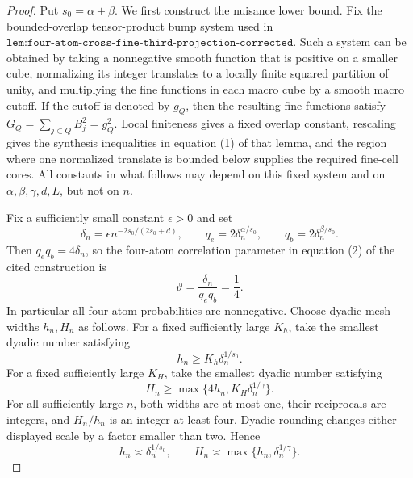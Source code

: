 \documentclass{article}
\begin{document}
\begin{proof}
Put \(s_0=\alpha+\beta\).  We first construct the nuisance lower bound.  Fix the bounded-overlap tensor-product bump system used in \(\texttt{lem:four-atom-cross-fine-third-projection-corrected}\).  Such a system can be obtained by taking a nonnegative smooth function that is positive on a smaller cube, normalizing its integer translates to a locally finite squared partition of unity, and multiplying the fine functions in each macro cube by a smooth macro cutoff.  If the cutoff is denoted by \(g_Q\), then the resulting fine functions satisfy \(G_Q=\sum_{j\subset Q}B_j^2=g_Q^2\).  Local finiteness gives a fixed overlap constant, rescaling gives the synthesis inequalities in equation (1) of that lemma, and the region where one normalized translate is bounded below supplies the required fine-cell cores.  All constants in what follows may depend on this fixed system and on \(\alpha,\beta,\gamma,d,L\), but not on \(n\).

Fix a sufficiently small constant \(\epsilon>0\) and set
\[
 \delta_n=\epsilon n^{-2s_0/(2s_0+d)},
 \qquad
 q_e=2\delta_n^{\alpha/s_0},
 \qquad
 q_b=2\delta_n^{\beta/s_0}.
\]
Then \(q_eq_b=4\delta_n\), so the four-atom correlation parameter in equation (2) of the cited construction is
\[
 \vartheta=\frac{\delta_n}{q_eq_b}=\frac14.
\]
In particular all four atom probabilities are nonnegative.  Choose dyadic mesh widths \(h_n,H_n\) as follows.  For a fixed sufficiently large \(K_h\), take the smallest dyadic number satisfying
\[
 h_n\geq K_h\delta_n^{1/s_0}.
\]
For a fixed sufficiently large \(K_H\), take the smallest dyadic number satisfying
\[
 H_n\geq\max\{4h_n,K_H\delta_n^{1/\gamma}\}.
\]
For all sufficiently large \(n\), both widths are at most one, their reciprocals are integers, and \(H_n/h_n\) is an integer at least four.  Dyadic rounding changes either displayed scale by a factor smaller than two.  Hence
\[
 h_n\asymp\delta_n^{1/s_0},
 \qquad
 H_n\asymp\max\{h_n,\delta_n^{1/\gamma}\}.
\]


\end{proof}
\end{document}
